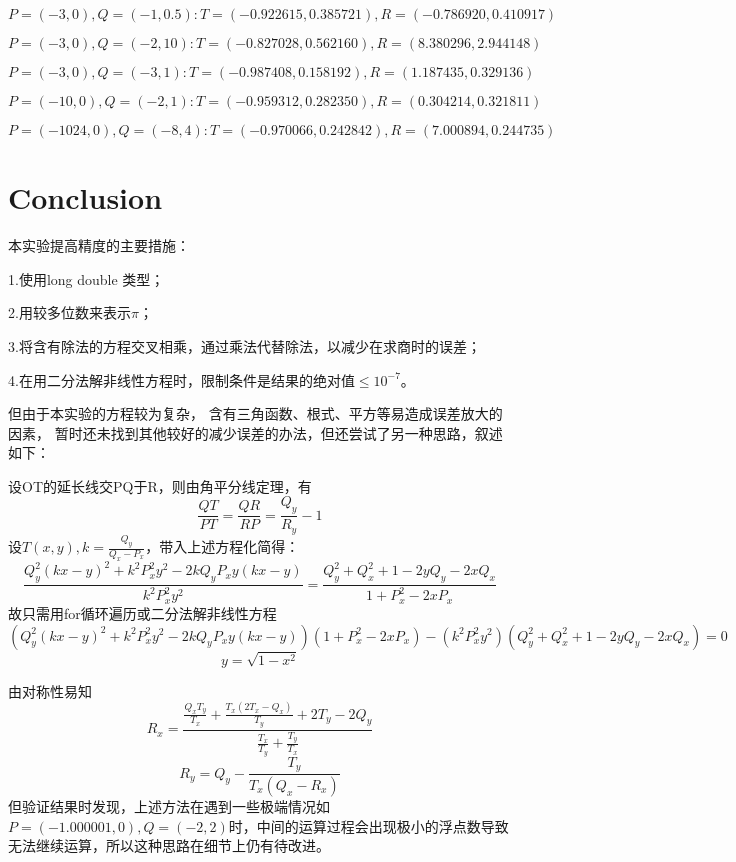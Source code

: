 \documentclass{ctexart}
\begin{document}
$$P = (-3, 0), Q = (-1, 0.5):T = (-0.922615 , 0.385721) , R = (-0.786920 , 0.410917)$$

$$P = (-3, 0), Q = (-2, 10):T = (-0.827028 , 0.562160) , R = (8.380296 , 2.944148)$$

$$P = (-3, 0), Q = (-3, 1):T = (-0.987408 , 0.158192) , R = (1.187435 , 0.329136)$$

$$P = (-10, 0), Q = (-2, 1):T = (-0.959312 , 0.282350) , R = (0.304214 , 0.321811)$$

$$P = (-1024, 0), Q = (-8, 4):T = (-0.970066 , 0.242842) , R = (7.000894 , 0.244735)$$
	
	
	\section{Conclusion}

本实验提高精度的主要措施：

1.使用long double 类型；

2.用较多位数来表示$\pi$；

3.将含有除法的方程交叉相乘，通过乘法代替除法，以减少在求商时的误差；

4.在用二分法解非线性方程时，限制条件是结果的绝对值$\leq10^{-7}$。

但由于本实验的方程较为复杂，
含有三角函数、根式、平方等易造成误差放大的因素，
暂时还未找到其他较好的减少误差的办法，但还尝试了另一种思路，叙述如下：

设OT的延长线交PQ于R，则由角平分线定理，有$$\frac{QT}{PT}=\frac{QR}{RP}=\frac{Q_y}{R_y}-1$$
设$T(x,y),k=\frac{Q_y}{Q_x-P_x}$，带入上述方程化简得：
$$\frac{Q_y^2(kx-y)^2+k^2P_x^2y^2-2kQ_yP_xy(kx-y)}{k^2P_x^2y^2}=\frac{Q_y^2+Q_x^2+1-2yQ_y-2xQ_x}{1+P_x^2-2xP_x}$$
故只需用for循环遍历或二分法解非线性方程$$(Q_y^2(kx-y)^2+k^2P_x^2y^2-2kQ_yP_xy(kx-y))(1+P_x^2-2xP_x)-(k^2P_x^2y^2)(Q_y^2+Q_x^2+1-2yQ_y-2xQ_x)=0$$
$$y=\sqrt{1-x^2}$$

由对称性易知
$$R_x=\frac{\frac{Q_xT_y}{T_x} + \frac{T_x(2T_x - Q_x)}{T_y} + 2T_y -2Q_y}{\frac{T_x}{T_y}+\frac{T_y}{T_x}}$$
$$R_y=Q_y-\frac{T_y}{T_x(Q_x - R_x)}$$
但验证结果时发现，上述方法在遇到一些极端情况如$P = (-1.000001, 0), Q = (-2, 2)$时，中间的运算过程会出现极小的浮点数导致无法继续运算，所以这种思路在细节上仍有待改进。
\end{document}
